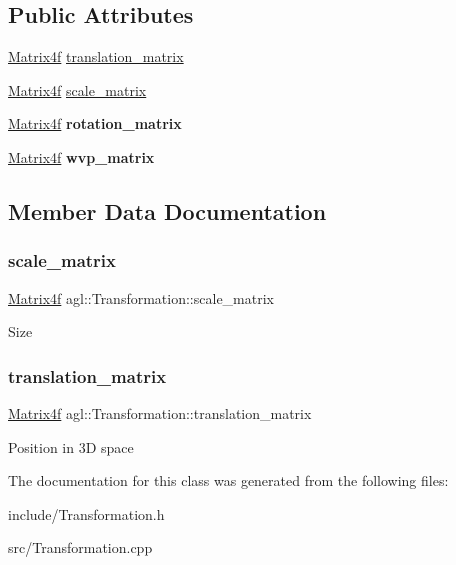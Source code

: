 \subsection*{Public Attributes}
\begin{DoxyCompactItemize}
\item 
\mbox{\hyperlink{classagl_1_1Matrix4f}{Matrix4f}} \mbox{\hyperlink{classagl_1_1Transformation_a214021890dbcbf0ffa9dd153081c097a}{translation\+\_\+matrix}}
\item 
\mbox{\hyperlink{classagl_1_1Matrix4f}{Matrix4f}} \mbox{\hyperlink{classagl_1_1Transformation_a986f0d47080a364fc7a2b098eb1b16a7}{scale\+\_\+matrix}}
\item 
\mbox{\label{classagl_1_1Transformation_a2dc5ac8d2ac0bc80d6e95183eec1fbdc}} 
\mbox{\hyperlink{classagl_1_1Matrix4f}{Matrix4f}} {\bfseries rotation\+\_\+matrix}
\item 
\mbox{\label{classagl_1_1Transformation_a59c2efee483f4fb596ce820a1d6a689b}} 
\mbox{\hyperlink{classagl_1_1Matrix4f}{Matrix4f}} {\bfseries wvp\+\_\+matrix}
\end{DoxyCompactItemize}


\subsection{Member Data Documentation}
\mbox{\label{classagl_1_1Transformation_a986f0d47080a364fc7a2b098eb1b16a7}} 
\subsubsection{\texorpdfstring{scale\_matrix}{scale\_matrix}}
{\footnotesize\ttfamily \mbox{\hyperlink{classagl_1_1Matrix4f}{Matrix4f}} agl\+::\+Transformation\+::scale\+\_\+matrix}

Size \mbox{\label{classagl_1_1Transformation_a214021890dbcbf0ffa9dd153081c097a}} 
\subsubsection{\texorpdfstring{translation\_matrix}{translation\_matrix}}
{\footnotesize\ttfamily \mbox{\hyperlink{classagl_1_1Matrix4f}{Matrix4f}} agl\+::\+Transformation\+::translation\+\_\+matrix}

Position in 3D space 

The documentation for this class was generated from the following files\+:\begin{DoxyCompactItemize}
\item 
include/Transformation.\+h\item 
src/Transformation.\+cpp\end{DoxyCompactItemize}
